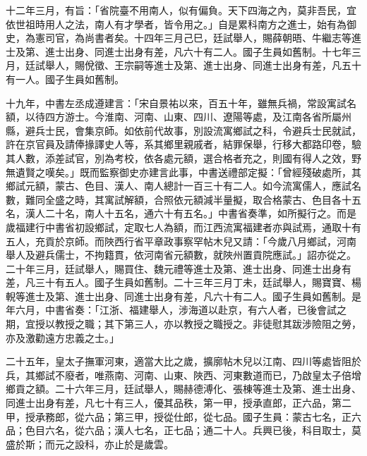 \begin{pinyinscope}
 十二年三月，有旨：「省院臺不用南人，似有偏負。天下四海之內，莫非吾民，宜依世祖時用人之法，南人有才學者，皆令用之。」自是累科南方之進士，始有為御史，為憲司官，為尚書者矣。十四年三月己巳，廷試舉人，賜薛朝晤、牛繼志等進士及第、進士出身、同進士出身有差，凡六十有二人。國子生員如舊制。十七年三月，廷試舉人，賜侻徵、王宗嗣等進士及第、進士出身、同進士出身有差，凡五十有一人。國子生員如舊制。



 十九年，中書左丞成遵建言：「宋自景祐以來，百五十年，雖無兵禍，常設寓試名額，以待四方游士。今淮南、河南、山東、四川、遼陽等處，及江南各省所屬州縣，避兵士民，會集京師。如依前代故事，別設流寓鄉試之科，令避兵士民就試，許在京官員及請俸掾譯史人等，系其鄉里親戚者，結罪保舉，行移大都路印卷，驗其人數，添差試官，別為考校，依各處元額，選合格者充之，則國有得人之效，野無遺賢之嘆矣。」既而監察御史亦建言此事，中書送禮部定擬：「曾經殘破處所，其鄉試元額，蒙古、色目、漢人、南人總計一百三十有二人。如今流寓儒人，應試名數，難同全盛之時，其寓試解額，合照依元額減半量擬，取合格蒙古、色目各十五名，漢人二十名，南人十五名，通六十有五名。」中書省奏準，如所擬行之。而是歲福建行中書省初設鄉試，定取七人為額，而江西流寓福建者亦與試焉，通取十有五人，充貢於京師。而陜西行省平章政事察罕帖木兒又請：「今歲八月鄉試，河南舉人及避兵儒士，不拘籍貫，依河南省元額數，就陜州置貢院應試。」詔亦從之。二十年三月，廷試舉人，賜買住、魏元禮等進士及第、進士出身、同進士出身有差，凡三十有五人。國子生員如舊制。二十三年三月丁未，廷試舉人，賜寶寶、楊輗等進士及第、進士出身、同進士出身有差，凡六十有二人。國子生員如舊制。是年六月，中書省奏：「江浙、福建舉人，涉海道以赴京，有六人者，已後會試之期，宜授以教授之職；其下第三人，亦以教授之職授之。非徒慰其跋涉險阻之勞，亦及激勸遠方忠義之士。」



 二十五年，皇太子撫軍河東，適當大比之歲，擴廓帖木兒以江南、四川等處皆阻於兵，其鄉試不廢者，唯燕南、河南、山東、陜西、河東數道而已，乃啟皇太子倍增鄉貢之額。二十六年三月，廷試舉人，賜赫德溥化、張棟等進士及第、進士出身、同進士出身有差，凡七十有三人，優其品秩，第一甲，授承直郎，正六品，第二甲，授承務郎，從六品；第三甲，授從仕郎，從七品。國子生員：蒙古七名，正六品；色目六名，從六品；漢人七名，正七品；通二十人。兵興已後，科目取士，莫盛於斯；而元之設科，亦止於是歲雲。



\end{pinyinscope}